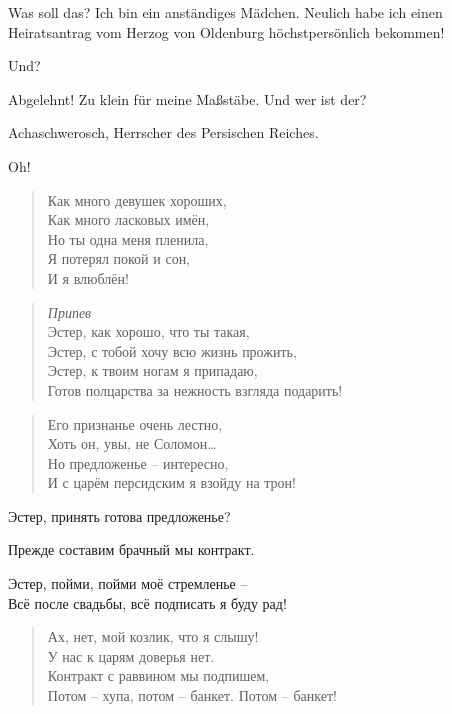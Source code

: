 \documentclass[12pt,a4paper,titlepage]{article}
\begin{document}
\begin{drama}
\espeaks
Was soll das? Ich bin ein anständiges Mädchen. Neulich habe ich
einen Heiratsantrag vom Herzog von Oldenburg höchstpersönlich bekommen!

\uespeaks
Und?

\espeaks
Abgelehnt! Zu klein für meine Maßstäbe. Und wer ist der?

\uespeaks
Achaschwerosch, Herrscher des Persischen Reiches.

\espeaks
Oh!

\ahspeaks {}
\begin{verse}
Как много девушек хороших,\\
Как много ласковых имён,\\
Но ты одна меня пленила,\\
Я потерял покой и сон,\\
И я влюблён!\\
\end{verse}

\begin{verse}
\textit{Припев}\\
Эстер, как хорошо, что ты такая,\\
Эстер, с тобой хочу всю жизнь прожить,\\
Эстер, к твоим ногам я припадаю,\\
Готов полцарства за нежность взгляда подарить!\\
\end{verse}

\espeaks {}
\begin{verse}
Его признанье очень лестно,\\
Хоть он, увы, не Соломон\ldots\\
Но предложенье -- интересно,\\
И с царём персидским я взойду на трон!\\
\end{verse}


Эстер, принять готова предложенье?

Прежде составим брачный мы контракт.

Эстер, пойми, пойми моё стремленье --\\
Всё после свадьбы, всё подписать я буду рад!

 
\begin{verse}
Ах, нет, мой козлик, что я слышу!\\
У нас к царям доверья нет.\\
Контракт с раввином мы подпишем,\\
Потом -- хупа, потом -- банкет. Потом -- банкет!\\
\end{verse}


\end{drama}
\end{document}
